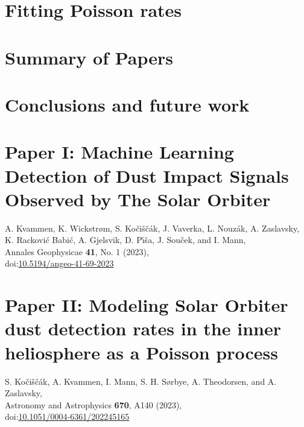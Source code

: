 \documentclass[11pt,twoside,openright]{book}
\begin{document}
\chapter{Fitting Poisson rates}


\chapter{Summary of Papers}\label{ch:sum-paper}




\chapter{Conclusions and future work}\label{ch:conclusion}





\backmatter



\chapter{Paper I: Machine Learning Detection of Dust Impact Signals Observed by The Solar Orbiter}
A. Kvammen, K. Wickstr{\o}m, S. Ko{\v{c}}i{\v{s}}{\v{c}}{\'a}k, J. Vaverka, L. Nouz{\'a}k, A. Zaslavsky, K. Rackovi{\'c} Babi{\'c}, A. Gjelsvik, D. P{\'\i}{\v{s}}a, J. Sou{\v{c}}ek, and I. Mann, \\
Annales Geophysicae {\bf 41}, No. 1 (2023),\\
doi:\href{https://doi.org/10.5194/angeo-41-69-2023}{10.5194/angeo-41-69-2023}
\newpage\null\newpage


\chapter{Paper II: Modeling Solar Orbiter dust detection rates in the inner heliosphere as a Poisson process}
S. Ko{\v{c}}i{\v{s}}{\v{c}}{\'a}k, A. Kvammen, I. Mann, S. H. S{\o}rbye, A. Theodorsen, and A. Zaslavsky,\\
Astronomy and Astrophysics {\bf 670}, A140 (2023),\\
doi:\href{https://doi.org/10.1051/0004-6361/202245165}{10.1051/0004-6361/202245165}
\newpage\null\newpage

\end{document}
